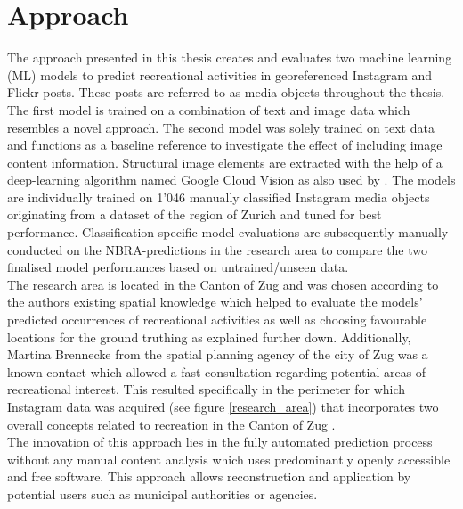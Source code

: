 \section{Approach}
The approach presented in this thesis creates and evaluates two machine learning (ML) models to predict recreational activities in georeferenced Instagram and Flickr posts. These posts are referred to as media objects throughout the thesis. The first model is trained on a combination of text and image data which resembles a novel approach. The second model was solely trained on text data and functions as a baseline reference to investigate the effect of including image content information. Structural image elements are extracted with the help of a deep-learning algorithm named Google Cloud Vision as also used by \textcite{Richards2018}. The models are individually trained on 1'046 manually classified Instagram media objects originating from a dataset of the region of Zurich \parencite{Gruzd2016} and tuned for best performance. Classification specific model evaluations are subsequently manually conducted on the NBRA-predictions in the research area to compare the two finalised model performances based on untrained/unseen data.\\
The research area is located in the Canton of Zug and was chosen according to the authors existing spatial knowledge which helped to evaluate the models' predicted occurrences of recreational activities as well as choosing favourable locations for the ground truthing as explained further down. Additionally, Martina Brennecke from the spatial planning agency of the city of Zug was a known contact which allowed a fast consultation regarding potential areas of recreational interest. This resulted specifically in the perimeter for which Instagram data was acquired (see figure \ref{research_area}) that incorporates two overall concepts related to recreation in the Canton of Zug \parencite{BaudirektiondesKantonsZug2012, Berchtold2011}.\\
\newline
The innovation of this approach lies in the fully automated prediction process without any manual content analysis which uses predominantly openly accessible and free software. This approach allows reconstruction and application by potential users such as municipal authorities or agencies. \\
\newline
